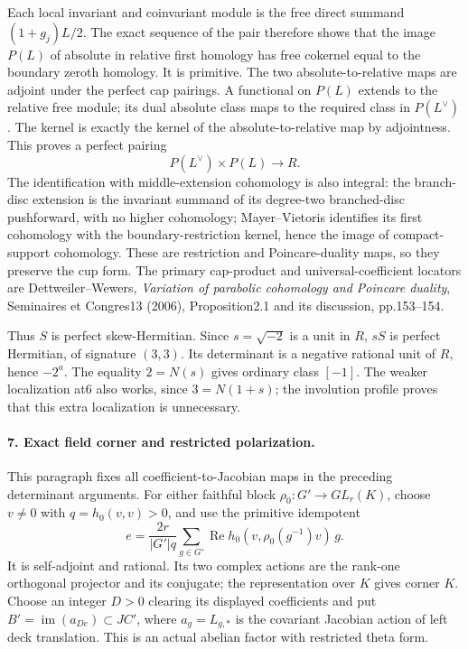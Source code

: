 Each local invariant and coinvariant module is the free
direct summand \((1+g_j)L/2\). The exact sequence of the
pair therefore shows that the image \(P(L)\) of absolute
in relative first homology has free cokernel equal to the
boundary zeroth homology. It is primitive. The two
absolute-to-relative maps are adjoint under the perfect
cap pairings. A functional on \(P(L)\) extends to the
relative free module; its dual absolute class maps to
the required class in \(P(L^\vee)\).
The kernel is exactly the kernel of the absolute-to-relative
map by adjointness. This proves a perfect pairing
\[
                         P(L^\vee)\times P(L)\longrightarrow R.
                                                               \tag{G27.18}
\]
The identification with middle-extension cohomology is also
integral: the branch-disc extension is the invariant summand
of its degree-two branched-disc pushforward, with no higher
cohomology; Mayer--Vietoris identifies its first cohomology
with the boundary-restriction kernel, hence the image of
compact-support cohomology. These are restriction and
Poincare-duality maps, so they preserve the cup form.
The primary cap-product and universal-coefficient locators
are Dettweiler--Wewers, \emph{Variation of parabolic cohomology
and Poincare duality}, Seminaires et Congres13 (2006),
Proposition2.1 and its discussion, pp.153--154.

Thus \(S\) is perfect skew-Hermitian. Since
\(s=\sqrt{-2}\) is a unit in \(R\), \(sS\) is perfect
Hermitian, of signature \((3,3)\). Its determinant is a
negative rational unit of \(R\), hence \(-2^a\).
The equality \(2=N(s)\) gives ordinary class \([-1]\).
The weaker localization at6 also works, since
\(3=N(1+s)\); the involution profile proves that this
extra localization is unnecessary.

\paragraph{7. Exact field corner and restricted polarization.}
This paragraph fixes all coefficient-to-Jacobian maps in the
preceding determinant arguments. For either faithful block
\(\rho_0:G'\to GL_r(K)\), choose \(v\ne0\) with
\(q=h_0(v,v)>0\), and use the primitive idempotent
\[
 e=\frac{2r}{|G'|q}\sum_{g\in G'}
       \operatorname{Re}h_0(v,\rho_0(g^{-1})v)\,g .
                                                               \tag{G27.19}
\]
It is self-adjoint and rational. Its two complex actions are
the rank-one orthogonal projector and its conjugate; the
representation over \(K\) gives corner \(K\).
Choose an integer \(D>0\) clearing its displayed coefficients
and put \(B'=\operatorname{im}(a_{De})\subset JC'\), where
\(a_g=L_{g,*}\) is the covariant Jacobian action of left deck
translation. This is an actual abelian factor with restricted
theta form.

